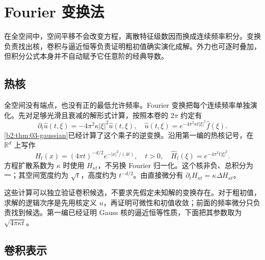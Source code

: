 \section{Fourier 变换法}
\label{b2:sec:1202}

在全空间中，空间平移不会改变方程，离散特征级数因而换成连续频率积分。变换负责找出核，卷积与逼近恒等负责证明粗初值确实演化成解。外力也可逐时叠加，但积分公式本身并不自动赋予它任意阶的经典导数。

\subsection{热核}
\label{b2:subsec:120201}

全空间没有端点，也没有正的最低允许频率。Fourier 变换把每个连续频率单独演化。先对足够光滑且衰减的解形式计算，按照本卷的 \(2\pi\) 约定有
\[
 \partial_t\widehat u(t,\xi)
 =-4\pi^2\kappa|\xi|^2\widehat u(t,\xi),
 \quad\widehat u(t,\xi)=e^{-4\pi^2\kappa t|\xi|^2}\widehat f(\xi).
\]
\cref{b2:thm:03-gaussian}已经计算了这个乘子的逆变换。沿用第一编的热核记号，在 \(\mathbb R^d\) 上写作
\begin{equation}\label{b2:eq:12-gauss-heat}
 H_t(x)=(4\pi t)^{-d/2}e^{-|x|^2/(4t)},
 \quad t>0,
 \quad\widehat H_t(\xi)=e^{-4\pi^2t|\xi|^2}.
\end{equation}
方程扩散系数为 \(\kappa\) 时使用 \(H_{\kappa t}\)，不另换 Fourier 归一化。这个核非负、总积分为一；其空间宽度约为 \(\sqrt t\)，高度约为 \(t^{-d/2}\)。由直接微分有 \(\partial_tH_{\kappa t}=\kappa\Delta H_{\kappa t}\)。

\ProseParagraphBreak

这些计算可以独立验证卷积候选，不要求先假定未知解的变换存在。对于粗初值，求解的逻辑次序是先用核定义 \(u\)，再证明可微性和初值收敛；前面的频率微分只负责找到候选。第一编已经证明 Gauss 核的逼近恒等性质，下面把其参数取为 \(\sqrt{4\pi\kappa t}\)。

\subsection{卷积表示}
\label{b2:subsec:120202}

